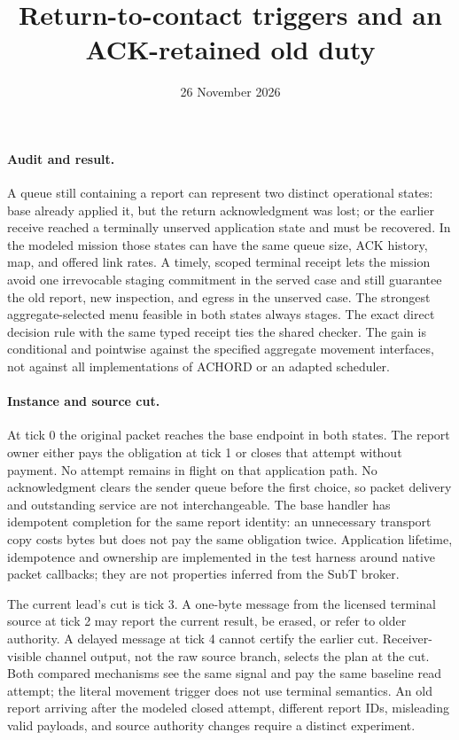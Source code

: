 \documentclass[11pt]{article}
\begin{document}
\title{Return-to-contact triggers and an ACK-retained old duty}
\author{}
\date{26 November 2026}
\maketitle

\paragraph{Audit and result.}
A queue still containing a report can represent two distinct
operational states: base already applied it, but the return
acknowledgment was lost; or the earlier receive reached a
terminally unserved application state and must be recovered.
In the modeled mission those states can have the same queue
size, ACK history, map, and offered link rates. A timely, scoped
terminal receipt lets the mission avoid one irrevocable staging
commitment in the served case and still guarantee the old report,
new inspection, and egress in the unserved case. The strongest
aggregate-selected menu feasible in both states always stages.
The exact direct decision rule with the same typed receipt ties
the shared checker. The gain is conditional and pointwise against
the specified aggregate movement interfaces, not against all
implementations of ACHORD or an adapted scheduler.

\paragraph{Instance and source cut.}
At tick 0 the original packet reaches the base endpoint in both
states. The report owner either pays the obligation at tick 1
or closes that attempt without payment. No attempt remains in
flight on that application path. No acknowledgment clears the sender
queue before the first choice, so packet delivery and outstanding
service are not interchangeable. The base handler has idempotent
completion for the same report identity: an unnecessary transport
copy costs bytes but does not pay the same obligation twice.
Application lifetime, idempotence and ownership are implemented in
the test harness around native packet callbacks; they are not
properties inferred from the SubT broker.

The current lead's cut is tick 3. A one-byte message from the
licensed terminal source at tick 2 may report the current result, be
erased, or refer to older authority. A delayed message at tick 4
cannot certify the earlier cut. Receiver-visible channel output,
not the raw source branch, selects the plan at the cut. Both
compared mechanisms see the same signal and pay the same baseline
read attempt; the literal movement trigger does not use terminal
semantics. An old report arriving after the modeled closed
attempt, different report IDs, misleading valid payloads, and
source authority changes require a distinct experiment.
\end{document}
